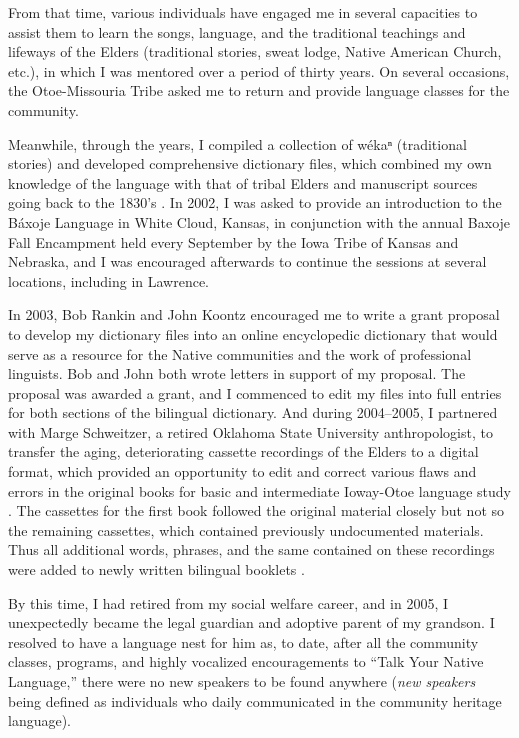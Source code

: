 \documentclass[output=paper]{LSP/langsci}
\begin{document}
From that time, various individuals have engaged me in several capacities to assist them to learn the songs, language, and the traditional teachings and lifeways of the Elders (traditional stories, sweat lodge, Native American Church, etc.), in which I was mentored over a period of thirty years. On several occasions, the Otoe-Missouria Tribe asked me to return and provide language classes for the community.  

Meanwhile, through the years, I compiled a collection of wékaⁿ (traditional stories) and developed comprehensive dictionary files, which combined my own knowledge of the language with that of tribal Elders and manuscript sources going back to the 1830's \citep{Goodtracks1992}. In 2002, I was asked to provide an introduction to the Báxoje Language in White Cloud, Kansas, in conjunction with the annual Baxoje Fall Encampment held every September by the Iowa Tribe of Kansas and Nebraska, and I was encouraged afterwards to continue the sessions at several locations, including in Lawrence. 

In 2003, Bob Rankin and John Koontz encouraged me to write a grant proposal to develop my dictionary files into an online encyclopedic dictionary that would serve as a resource for the Native communities and the work of professional linguists. Bob and John both wrote letters in support of my proposal. The proposal was awarded a grant, and I commenced to edit my files into full entries for both sections of the bilingual dictionary. And during 2004--2005, I partnered with Marge Schweitzer, a retired Oklahoma State University anthropologist, to transfer the aging, deteriorating cassette recordings of the Elders to a digital format, which provided an opportunity to edit and correct various flaws and errors in the original books for basic and intermediate Ioway-Otoe language study \citep{OtoeIowaWistrandRobinson1977, OtoeIowaWistrandRobinson1978}. The cassettes for the first book followed the original material closely but not so the remaining cassettes, which contained previously undocumented materials. Thus all additional words, phrases, and the same contained on these recordings were added to newly written bilingual booklets \citep{Goodtracks2004a, Goodtracks2004b}.

By this time, I had retired from my social welfare career, and in 2005, I unexpectedly became the legal guardian and adoptive parent of my grandson. I resolved to have a language nest for him as, to date, after all the community classes, programs, and highly vocalized encouragements to ``Talk Your Native Language,'' there were no new speakers to be found anywhere (\emph{new speakers} being defined as individuals who daily communicated in the community heritage language).  
\end{document}
